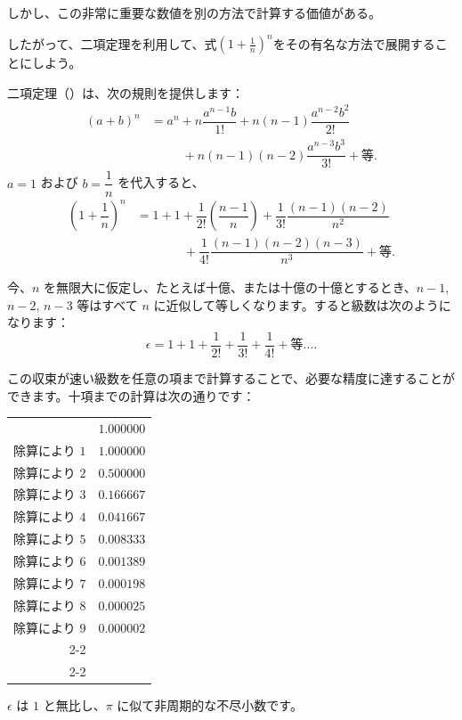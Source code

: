 \documentclass[a4paper,11pt,openany]{ltjsbook}
\begin{document}
しかし、この非常に重要な数値を別の方法で計算する価値がある。

したがって、二項定理を利用して、式$\left(1 + \frac{1}{n}\right)^n$をその有名な方法で展開することにしよう。

二項定理（）は、次の規則を提供します：
\begin{align*}
(a + b)^n &= a^n + n \dfrac{a^{n-1} b}{1!} + n(n - 1) \dfrac{a^{n-2} b^2}{2!} \\
  & \phantom{= a^n\ } + n(n -1)(n - 2) \dfrac{a^{n-3} b^3}{3!} + \text{等}.
\end{align*}
$a = 1$ および $b = \dfrac{1}{n}$ を代入すると、
\begin{align*}
\left(1 + \dfrac{1}{n}\right)^n
  &= 1 + 1 + \dfrac{1}{2!} \left(\dfrac{n - 1}{n}\right) + \dfrac{1}{3!} \dfrac{(n - 1)(n - 2)}{n^2} \\
  &\phantom{= 1 + 1\ } + \dfrac{1}{4!} \dfrac{(n - 1)(n - 2)(n - 3)}{n^3} + \text{等}.
\end{align*}

今、$n$ を無限大に仮定し、たとえば十億、または十億の十億とするとき、$n - 1$, $n - 2$, $n - 3$ 等はすべて $n$ に近似して等しくなります。すると級数は次のようになります：
\[
\epsilon = 1 + 1 + \dfrac{1}{2!} + \dfrac{1}{3!} + \dfrac{1}{4!} + \text{等}.\ldots
\]

この収束が速い級数を任意の項まで計算することで、必要な精度に達することができます。十項までの計算は次の通りです：

\begin{tabular}{@{}r<{\qquad}@{}l@{}}
                & $1.000000$ \\
除算により $1$ & $1.000000$ \\
除算により $2$ & $0.500000$ \\
除算により $3$ & $0.166667$ \\
除算により $4$ & $0.041667$ \\
除算により $5$ & $0.008333$ \\
除算により $6$ & $0.001389$ \\
除算により $7$ & $0.000198$ \\
除算により $8$ & $0.000025$ \\
除算により $9$ & $0.000002$ \\
\cline{2-2}
\multicolumn{2}{r@{}}{合計\quad $2.718281$} \\
\cline{2-2}
\end{tabular}

$\epsilon$ は $1$ と無比し、$\pi$ に似て非周期的な不尽小数です。
\end{document}

